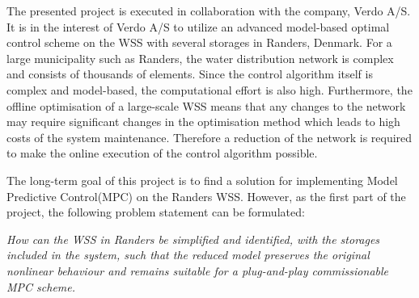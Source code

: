 The presented project is executed in collaboration with the company, Verdo A/S. It is in the interest of Verdo A/S to utilize an advanced model-based optimal control scheme on the WSS with several storages in Randers, Denmark. For a large municipality such as Randers, the water distribution network is complex and consists of thousands of elements. Since the control algorithm itself is complex and model-based, the computational effort is also high. Furthermore, the offline optimisation of a large-scale WSS means that any changes to the network may require significant changes in the optimisation method which leads to high costs of the system maintenance. Therefore a reduction of the network is required to make the online execution of the control algorithm possible. 

The long-term goal of this project is to find a solution for implementing Model Predictive Control(MPC) on the Randers WSS. However, as the first part of the project, the following problem statement can be formulated: 

\emph{How can the WSS in Randers be simplified and identified, with the storages included in the system, such that the reduced model preserves the original nonlinear behaviour and remains suitable for a plug-and-play commissionable MPC scheme.}









